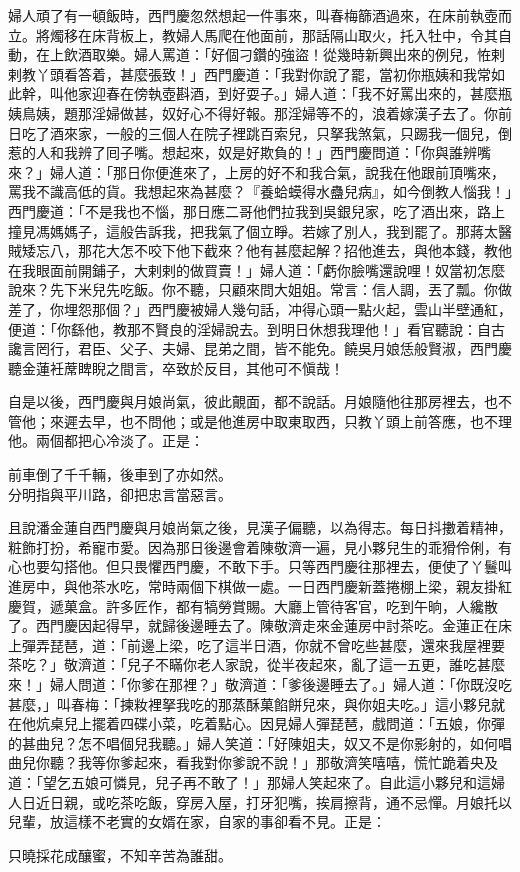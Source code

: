 婦人頑了有一頓飯時，西門慶忽然想起一件事來，叫春梅篩酒過來，在床前執壺而立。將燭移在床背板上，教婦人馬爬在他面前，那話隔山取火，托入牡中，令其自動，在上飲酒取樂。婦人罵道：「好個刁鑽的強盜！從幾時新興出來的例兒，恠剌剌教丫頭看答着，甚麼張致！」西門慶道：「我對你說了罷，當初你瓶姨和我常如此幹，叫他家迎春在傍執壺斟酒，到好耍子。」婦人道：「我不好罵出來的，甚麼瓶姨鳥姨，題那淫婦做甚，奴好心不得好報。那淫婦等不的，浪着嫁漢子去了。你前日吃了酒來家，一般的三個人在院子裡跳百索兒，只拏我煞氣，只踢我一個兒，倒惹的人和我辨了囘子嘴。想起來，奴是好欺負的！」西門慶問道：「你與誰辨嘴來？」婦人道：「那日你便進來了，上房的好不和我合氣，說我在他跟前頂嘴來，罵我不識高低的貨。我想起來為甚麼？『養蛤蟆得水蠱兒病』，如今倒教人惱我！」西門慶道：「不是我也不惱，那日應二哥他們拉我到吳銀兒家，吃了酒出來，路上撞見馮媽媽子，這般告訴我，把我氣了個立睜。若嫁了別人，我到罷了。那蔣太醫賊矮忘八，那花大怎不咬下他下截來？{}他有甚麼起解？招他進去，與他本錢，教他在我眼面前開鋪子，大剌剌的做買賣！」婦人道：「虧你臉嘴還說哩！{}奴當初怎麼說來？先下米兒先吃飯。你不聽，只顧來問大姐姐。常言：信人調，丟了瓢。你做差了，你埋怨那個？」西門慶被婦人幾句話，冲得心頭一點火起，雲山半壁通紅，便道：「你繇他，教那不賢良的淫婦說去。到明日休想我理他！」看官聽說：自古讒言罔行，君臣、父子、夫婦、昆弟之間，皆不能免。饒吳月娘恁般賢淑，西門慶聽金蓮衽蓆睥睨之間言，卒致於反目，其他可不愼哉！

自是以後，西門慶與月娘尚氣，彼此覿面，都不說話。月娘隨他往那房裡去，也不管他；來遲去早，也不問他；或是他進房中取東取西，只教丫頭上前答應，也不理他。兩個都把心冷淡了。正是：

\begin{myquote}
前車倒了千千輛，後車到了亦如然。\\分明指與平川路，卻把忠言當惡言。
\end{myquote}

且說潘金蓮自西門慶與月娘尚氣之後，見漢子偏聽，以為得志。每日抖擻着精神，粧飾打扮，希寵市愛。因為那日後邊會着陳敬濟一遍，見小夥兒生的乖猾伶俐，有心也要勾搭他。但只畏懼西門慶，不敢下手。只等西門慶往那裡去，便使了丫鬟叫進房中，與他茶水吃，常時兩個下棋做一處。一日西門慶新蓋捲棚上梁，親友掛紅慶賀，遞菓盒。許多匠作，都有犒勞賞賜。大廳上管待客官，吃到午晌，人纔散了。西門慶因起得早，就歸後邊睡去了。陳敬濟走來金蓮房中討茶吃。金蓮正在床上彈弄琵琶，道：「前邊上梁，吃了這半日酒，你就不曾吃些甚麼，還來我屋裡要茶吃？」敬濟道：「兒子不瞞你老人家說，從半夜起來，亂了這一五更，誰吃甚麼來！」婦人問道：「你爹在那裡？」{}敬濟道：「爹後邊睡去了。」婦人道：「你既沒吃甚麼，」叫春梅：「揀籹裡拏我吃的那蒸酥菓餡餅兒來，與你姐夫吃。」這小夥兒就在他炕桌兒上擺着四碟小菜，吃着點心。因見婦人彈琵琶，戲問道：「五娘，你彈的甚曲兒？怎不唱個兒我聽。」婦人笑道：「好陳姐夫，奴又不是你影射的，{}如何唱曲兒你聽？我等你爹起來，看我對你爹說不說！」那敬濟笑嘻嘻，慌忙跪着央及道：「望乞五娘可憐見，兒子再不敢了！」{}那婦人笑起來了。自此這小夥兒和這婦人日近日親，或吃茶吃飯，穿房入屋，打牙犯嘴，挨肩擦背，通不忌憚。月娘托以兒輩，放這樣不老實的女婿在家，自家的事卻看不見。正是：

\begin{myquote}
只曉採花成釀蜜，不知辛苦為誰甜。
\end{myquote}

